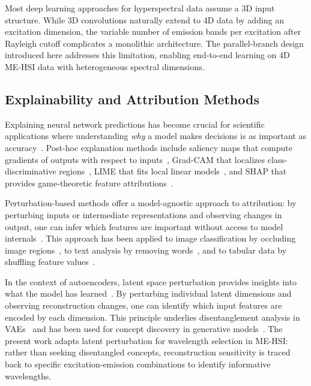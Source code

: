 Most deep learning approaches for hyperspectral data assume a 3D input structure.
While 3D convolutions naturally extend to 4D data by adding an excitation dimension, the variable number of emission bands per excitation after Rayleigh cutoff complicates a monolithic architecture.
The parallel-branch design introduced here addresses this limitation, enabling end-to-end learning on 4D ME-HSI data with heterogeneous spectral dimensions.

\subsection{Explainability and Attribution Methods}
\label{sec:related_explain}

Explaining neural network predictions has become crucial for scientific applications where understanding \emph{why} a model makes decisions is as important as accuracy~\cite{gilpin2018explaining}.
Post-hoc explanation methods include saliency maps that compute gradients of outputs with respect to inputs~\cite{simonyan2014deep}, Grad-CAM that localizes class-discriminative regions~\cite{selvaraju2017grad}, LIME that fits local linear models~\cite{ribeiro2016should}, and SHAP that provides game-theoretic feature attributions~\cite{lundberg2017unified}.

Perturbation-based methods offer a model-agnostic approach to attribution: by perturbing inputs or intermediate representations and observing changes in output, one can infer which features are important without access to model internals~\cite{zeiler2014visualizing}.
This approach has been applied to image classification by occluding image regions~\cite{zeiler2014visualizing}, to text analysis by removing words~\cite{li2016understanding}, and to tabular data by shuffling feature values~\cite{fisher2019all}.

In the context of autoencoders, latent space perturbation provides insights into what the model has learned~\cite{higgins2017beta}.
By perturbing individual latent dimensions and observing reconstruction changes, one can identify which input features are encoded by each dimension.
This principle underlies disentanglement analysis in VAEs~\cite{chen2018isolating} and has been used for concept discovery in generative models~\cite{voynov2020unsupervised}.
The present work adapts latent perturbation for wavelength selection in ME-HSI: rather than seeking disentangled concepts, reconstruction sensitivity is traced back to specific excitation-emission combinations to identify informative wavelengths.

